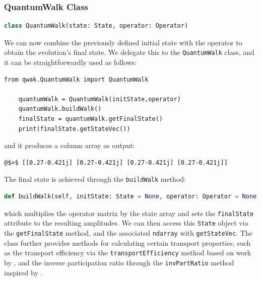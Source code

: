 \documentclass[main.tex]{subfiles}
\begin{document}
\subsubsection{QuantumWalk Class}

\begin{lstlisting}[style=commands,language=Python,mathescape]
    class QuantumWalk(state: State, operator: Operator)
\end{lstlisting}
We can now combine the previously defined initial state with the operator 
to obtain the evolution's final state. We delegate this to the
\texttt{QuantumWalk} class, and it can be straightforwardly used as follows:
\begin{lstlisting}[style=code,escapeinside={__}]
    from qwak.QuantumWalk import QuantumWalk 

    quantumWalk = QuantumWalk(initState,operator)
    quantumWalk.buildWalk()
    finalState = quantumWalk.getFinalState()
    print(finalState.getStateVec())
\end{lstlisting}
and it produces a column array as output:
\begin{lstlisting}[style=commands,mathescape]
@$>$ [[0.27-0.421j] [0.27-0.421j] [0.27-0.421j] [0.27-0.421j]]
\end{lstlisting}\par

The final state is achieved through the \texttt{buildWalk} method: 
\begin{lstlisting}[style=commands,mathescape,language=Python]
    def buildWalk(self, initState: State = None, operator: Operator = None)
\end{lstlisting}
which multiplies the operator matrix by the state array and sets the
\texttt{finalState} attribute to the resulting amplitudes. We can then access
this \texttt{State} object via the \texttt{getFinalState} method, and the
associated \texttt{ndarray} with \texttt{getStateVec}. The class further
provides methods for calculating certain transport properties, such as the
transport efficiency via the \texttt{transportEfficiency} method based on work
by \cite{razzoli21}, and the inverse participation ratio through the
\texttt{invPartRatio} method inspired by \cite{buarqueAperiodic19}. 
\end{document}
